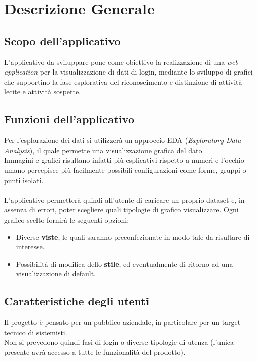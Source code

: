 \section{Descrizione Generale}
\subsection{Scopo dell'applicativo}

L'applicativo da sviluppare pone come obiettivo la realizzazione di una \textit{web application} per la visualizzazione di dati di login, mediante lo sviluppo di grafici che supportino la fase esplorativa del riconoscimento e distinzione di attività lecite e attività sospette.

\subsection{Funzioni dell'applicativo}

Per l'esplorazione dei dati si utilizzerà un approccio EDA (\textit{Exploratory Data Analysis}), il quale permette una visualizzazione grafica del dato. \\ 
Immagini e grafici risultano infatti più esplicativi rispetto a numeri e l'occhio umano percepisce più facilmente possibili configurazioni come forme, gruppi o punti isolati. \\ \\
L'applicativo permetterà quindi all'utente di caricare un proprio dataset e, in assenza di errori, poter scegliere quali tipologie di grafico visualizzare. Ogni grafico scelto fornirà le seguenti opzioni:
\begin{itemize}
\item Diverse \textbf{viste}, le quali saranno preconfezionate in modo tale da risultare di interesse.
\item Possibilità di modifica dello \textbf{stile}, ed eventualmente di ritorno ad una visualizzazione di default.
\end{itemize}

\subsection{Caratteristiche degli utenti}

Il progetto è pensato per un pubblico aziendale, in particolare per un target tecnico di sistemisti.\\
Non si prevedono quindi fasi di login o diverse tipologie di utenza (l'unica presente avrà accesso a tutte le funzionalità del prodotto).

